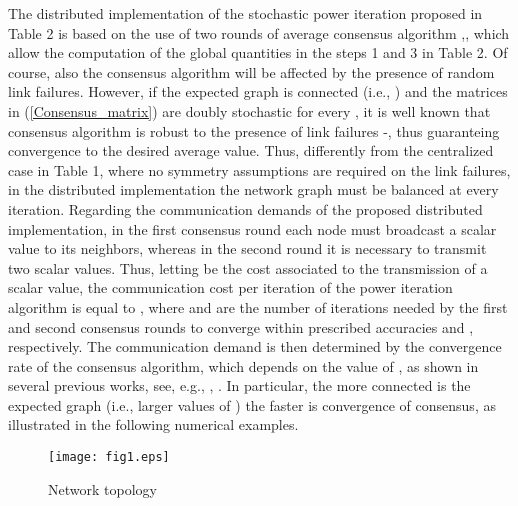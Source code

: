 \documentclass[10pt,twocolumn]{IEEEtran}
\begin{document}
 The distributed implementation of the stochastic power iteration proposed in Table 2 is based on the use of two rounds of average consensus algorithm \cite{Olfati1},\cite{Barb-Scut}, which allow the computation of the global quantities in the steps 1 and 3 in Table 2. Of course, also the consensus algorithm will be affected by the presence of random link failures.
However, if the expected graph is connected (i.e., ) and the matrices  in (\ref{Consensus_matrix}) are doubly stochastic for every , it is well known that consensus algorithm is robust to the presence of link failures \cite{Tahbaz-Salehi-Jadb1}-\cite{Kar-Moura2}, thus guaranteing convergence to the desired average value. Thus, differently from the centralized case in Table 1, where no symmetry assumptions are required on the link failures, in the distributed implementation the network graph must be balanced at every iteration.
Regarding the communication demands of the proposed distributed implementation, in the first consensus round each node must broadcast a scalar value to its neighbors, whereas in the second round it is necessary to transmit two scalar values. Thus, letting  be the cost associated to the transmission of a scalar value, the communication cost per iteration  of the power iteration algorithm is equal to , where  and  are the number of iterations needed by the first and second consensus rounds to converge within  prescribed accuracies  and , respectively. The communication demand is then determined by the convergence rate of the consensus algorithm, which depends on the value of , as shown in several previous works, see, e.g., \cite{Kar-Moura}, \cite{Kar-Moura2}. In particular, the more connected is the expected graph (i.e., larger values of ) the faster is convergence of consensus, as illustrated in the following numerical examples.

\begin{figure}[t]
\centering
\texttt{[image: fig1.eps]}
  \caption{Network topology}\label{Net}
\end{figure}
\end{document}
